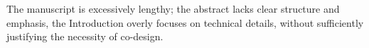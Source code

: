 \begin{revcomment}
The manuscript is excessively lengthy; the abstract lacks clear structure and emphasis, the Introduction overly focuses on technical details, without sufficiently justifying the necessity of co-design. 

\end{revcomment}
